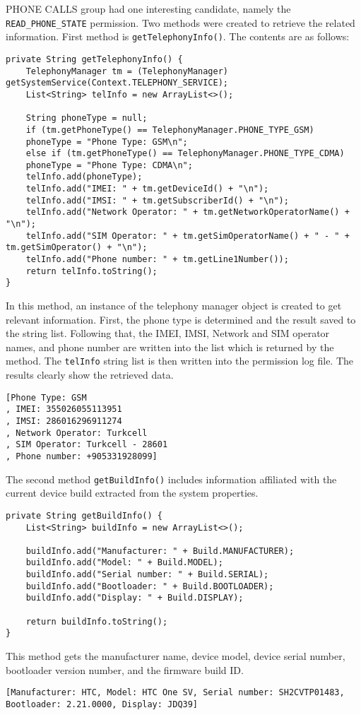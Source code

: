 \documentclass[
  a4paper,  %
  twoside,  %
  bibliography=totoc,
  headsepline,
  cleardoublepage=empty,
  parskip=half,
  draft=false,
  open=any
]{scrbook}
\begin{document}
PHONE CALLS group had one interesting candidate, namely the  \texttt{READ\_PHONE\_STATE} permission. Two methods were created to retrieve the related information. First method is \texttt{getTelephonyInfo()}. The contents are as follows:
\begin{lstlisting}
private String getTelephonyInfo() {
	TelephonyManager tm = (TelephonyManager) getSystemService(Context.TELEPHONY_SERVICE);
	List<String> telInfo = new ArrayList<>();
	
	String phoneType = null;
	if (tm.getPhoneType() == TelephonyManager.PHONE_TYPE_GSM)
	phoneType = "Phone Type: GSM\n";
	else if (tm.getPhoneType() == TelephonyManager.PHONE_TYPE_CDMA)
	phoneType = "Phone Type: CDMA\n";
	telInfo.add(phoneType);
	telInfo.add("IMEI: " + tm.getDeviceId() + "\n");
	telInfo.add("IMSI: " + tm.getSubscriberId() + "\n");
	telInfo.add("Network Operator: " + tm.getNetworkOperatorName() + "\n");
	telInfo.add("SIM Operator: " + tm.getSimOperatorName() + " - " + tm.getSimOperator() + "\n");
	telInfo.add("Phone number: " + tm.getLine1Number());
	return telInfo.toString();
}
\end{lstlisting}
In this method, an instance of the telephony manager object is created to get relevant information. First, the phone type is determined and the result saved to the string list. Following that, the IMEI, IMSI, Network and SIM operator names, and phone number are written into the list which is returned by the method. The \texttt{telInfo} string list is then written into the permission log file. The results clearly show the retrieved data.
\begin{lstlisting}
[Phone Type: GSM
, IMEI: 355026055113951
, IMSI: 286016296911274
, Network Operator: Turkcell
, SIM Operator: Turkcell - 28601
, Phone number: +905331928099]
\end{lstlisting} 

The second method \texttt{getBuildInfo()} includes information affiliated with the current device build extracted from the system properties.
\begin{lstlisting}
private String getBuildInfo() {
	List<String> buildInfo = new ArrayList<>();
	
	buildInfo.add("Manufacturer: " + Build.MANUFACTURER);
	buildInfo.add("Model: " + Build.MODEL);
	buildInfo.add("Serial number: " + Build.SERIAL);
	buildInfo.add("Bootloader: " + Build.BOOTLOADER);
	buildInfo.add("Display: " + Build.DISPLAY);
	
	return buildInfo.toString();
}
\end{lstlisting} 
This method gets the manufacturer name, device model, device serial number, bootloader version number, and the firmware build ID.
\begin{lstlisting}
[Manufacturer: HTC, Model: HTC One SV, Serial number: SH2CVTP01483, Bootloader: 2.21.0000, Display: JDQ39]
\end{lstlisting}
\end{document}
